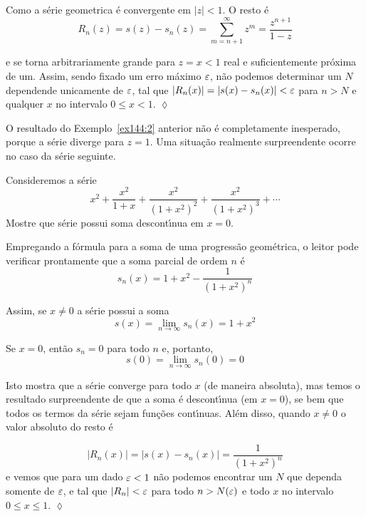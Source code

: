 \solo Como a s\'{e}rie geometrica \'{e} convergente em $|z|<1$. O resto \'{e}
\begin{equation*}
R_n(z) = s(z) -
s_n(z)=\sum_{m=n+1}^{\infty}z^m=\frac{z^{n+1}}{1-z}
\end{equation*}

e se torna arbitrariamente grande para $z = x < 1$ real e
suficientemente pr\'{o}xima de um. Assim, sendo fixado um erro m\'{a}ximo
$\varepsilon$, n\~{a}o podemos determinar um $N$ dependende unicamente de
$\varepsilon$, tal que $|R_n(x)| = |s(x) - s_n(x)| < \varepsilon$ para $n > N$ e
qualquer $x$ no intervalo $0 \le x < 1$. \hfill \(\lozenge\)


O resultado do Exemplo~\ref{ex144:2} anterior n\~{a}o \'{e} completamente
inesperado, porque a s\'{e}rie diverge para $z = 1$. Uma situa\c{c}\~{a}o
realmente surpreendente ocorre no caso da s\'{e}rie seguinte.

\begin{exer}\label{ex144:3}
Consideremos a s\'{e}rie
\begin{equation*}
x^2 + \frac{x^2}{1 + x} + \frac{x^2}{(1 + x^2)^2}+\frac{x^2}{(1 +
x^2)^3} +\cdots
\end{equation*}
Mostre que s\'{e}rie possui soma descont\'{\i}nua em $x=0$.
\end{exer}

\solo Empregando a f\'{o}rmula para a soma de uma progress\~{a}o
geom\'{e}trica, o leitor pode verificar prontamente que a soma parcial
de ordem $n$ \'{e}
\begin{equation*}
s_n(x)= 1 + x^2 -  \frac{1}{(1 + x^2)^n}
\end{equation*}

Assim, se $x\neq 0$ a s\'{e}rie possui a soma
\begin{equation*}
s(x)=\lim_{n\to\infty}s_n(x)=1+x^2
\end{equation*}

Se $x = 0$, ent\~{a}o $s_n = 0$ para todo $n$ e, portanto,
\begin{equation*}
s(0) = \lim_{n\to\infty}s_n( 0)=0
\end{equation*}

Isto mostra que a s\'{e}rie converge para todo $x$ (de maneira
absoluta), mas temos o resultado surpreendente de que a soma \'{e}
descont\'{\i}nua (em $x = 0$), se bem que todos os termos da s\'{e}rie
sejam fun\c{c}\~{o}es cont\'{\i}nuas. Al\'{e}m disso, quando $x\neq 0$ o valor
absoluto do resto \'{e}

\begin{equation*}
|R_n(x)| = |s(x) - s_n(x)|=\frac{1}{(1+x^2)^n}
\end{equation*}
e vemos que para um dado $\varepsilon< 1$ n\~{a}o podemos encontrar um $N$
que dependa somente de $\varepsilon$, e tal que $|R_n| < \varepsilon$ para todo
$n> N(\varepsilon)$ e todo $x$ no intervalo $0\le x \le 1$. \hfill
\(\lozenge\)

